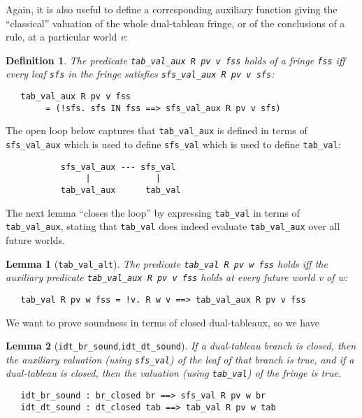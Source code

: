 \documentclass[a4paper]{article}
\newtheorem{lemma}{Lemma}
\newtheorem{definition}{Definition}
\begin{document}
Again, it is also useful to define a corresponding auxiliary function
giving the ``classical'' valuation of the whole dual-tableau fringe,
or of the conclusions of a rule, at a particular world \textit{v}:
\begin{definition}
The predicate
\texttt{tab\_val\_aux R pv v fss}
holds of a fringe 
\texttt{fss}
iff every leaf
\texttt{sfs}
in the fringe satisfies
\texttt{sfs\_val\_aux R pv v sfs}:
\begin{verbatim}
   tab_val_aux R pv v fss 
        = (!sfs. sfs IN fss ==> sfs_val_aux R pv v sfs)
\end{verbatim}
\end{definition}

The open loop below captures that \texttt{tab\_val\_aux} is defined in
terms of \texttt{sfs\_val\_aux} which is used to define
\texttt{sfs\_val} which is used to define \texttt{tab\_val}:
\begin{verbatim}
           sfs_val_aux --- sfs_val
                |             |
           tab_val_aux      tab_val
\end{verbatim}
The next lemma ``closes the loop'' by expressing \texttt{tab\_val} in terms of
\texttt{tab\_val\_aux}, stating that \texttt{tab\_val} does indeed
evaluate \texttt{tab\_val\_aux} over all future worlds.

\begin{lemma}[\texttt{tab\_val\_alt}]
The predicate \texttt{tab\_val R pv w fss} holds iff 
the auxiliary predicate \texttt{tab\_val\_aux R pv v fss} holds at
every future world \textit{v} of \textit{w}:
\begin{verbatim}
   tab_val R pv w fss = !v. R w v ==> tab_val_aux R pv v fss
\end{verbatim}
\end{lemma}

We want to prove soundness in terms of closed dual-tableaux, so we have

\begin{lemma}[\texttt{idt\_br\_sound},\texttt{idt\_dt\_sound}]
\label{idt-br-sound} \label{idt-dt-sound}
  If a dual-tableau branch is closed, then the auxiliary valuation (using
  \texttt{sfs\_val}) of the leaf of that branch is true, and if a
  dual-tableau is closed, then the valuation (using
  \texttt{tab\_val}) of the fringe is true.
\end{lemma}
\begin{verbatim}
   idt_br_sound : br_closed br ==> sfs_val R pv w br
   idt_dt_sound : dt_closed tab ==> tab_val R pv w tab
\end{verbatim}
\end{document}
